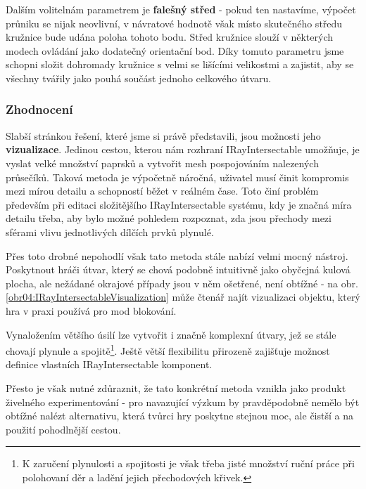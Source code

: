 Dalším volitelnám parametrem je \textbf{falešný střed} - pokud ten nastavíme, výpočet průniku se nijak neovlivní, v návratové hodnotě však místo skutečného středu kružnice bude udána poloha tohoto bodu. Střed kružnice slouží v některých modech ovládání jako dodatečný orientační bod. Díky tomuto parametru jsme schopni složit dohromady kružnice s velmi se lišícími velikostmi a zajistit, aby se všechny tvářily jako pouhá součást jednoho celkového útvaru. 


\subsubsection*{Zhodnocení}

Slabší stránkou řešení, které jsme si právě představili, jsou možnosti jeho \textbf{vizualizace}. Jedinou cestou, kterou nám rozhraní IRayIntersectable umožňuje, je vyslat velké množství paprsků a vytvořit mesh pospojováním nalezených průsečíků. Taková metoda je výpočetně náročná, uživatel musí činit kompromis mezi mírou detailu a schopností běžet v reálném čase. Toto činí problém především při editaci složitějšího IRayIntersectable systému, kdy je značná míra detailu třeba, aby bylo možné pohledem rozpoznat, zda jsou přechody mezi sférami vlivu jednotlivých dílčích prvků plynulé. 

Přes toto drobné nepohodlí však tato metoda stále nabízí velmi mocný nástroj. Poskytnout hráči útvar, který se chová podobně intuitivně jako obyčejná kulová plocha, ale nežádané okrajové případy jsou v něm ošetřené, není obtížné - na obr.\ref{obr04:IRayIntersectableVisualization} může čtenář najít vizualizaci objektu, který hra v praxi používá pro mod blokování. 


Vynaložením většího úsilí lze vytvořit i značně komplexní útvary, jež se stále chovají plynule a spojitě\footnote{K zaručení plynulosti a spojitosti je však třeba jisté množství ruční práce při polohovaní děr a ladění jejich přechodových křivek.}. Ještě větší flexibilitu přirozeně zajišťuje možnost definice vlastních IRayIntersectable komponent. 

Přesto je však nutné zdůraznit, že tato konkrétní metoda vznikla jako produkt živelného experimentování - pro navazující výzkum by pravděpodobně nemělo být obtížné nalézt alternativu, která tvůrci hry poskytne stejnou moc, ale čistší a na použití pohodlnější cestou. 


